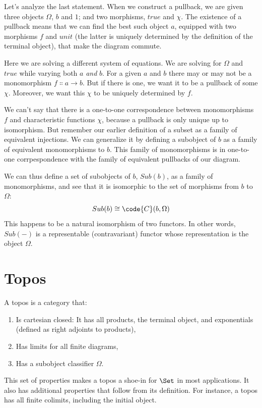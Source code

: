 Let's analyze the last statement. When we construct a pullback, we are
given three objects $\Omega$, $b$ and $1$; and two
morphisms, $true$ and $\chi$. The existence of a pullback
means that we can find the best such object $a$, equipped with
two morphisms $f$ and $unit$ (the latter is uniquely
determined by the definition of the terminal object), that make the
diagram commute.

Here we are solving a different system of equations. We are solving for
$\Omega$ and $true$ while varying both $a$ \emph{and}
$b$. For a given $a$ and $b$ there may or may not
be a monomorphism $f \Colon a \to b$. But if there is one, we
want it to be a pullback of some $\chi$. Moreover, we want this
$\chi$ to be uniquely determined by $f$.

We can't say that there is a one-to-one correspondence between
monomorphisms $f$ and characteristic functions $\chi$,
because a pullback is only unique up to isomorphism. But remember our
earlier definition of a subset as a family of equivalent injections. We
can generalize it by defining a subobject of $b$ as a family of
equivalent monomorphisms to $b$. This family of monomorphisms is
in one-to-one corrpespondence with the family of equivalent pullbacks of
our diagram.

We can thus define a set of subobjects of $b$, $Sub(b)$,
as a family of monomorphisms, and see that it is isomorphic to the set
of morphisms from $b$ to $\Omega$:
\[Sub(b) \cong \code{C}(b, \Omega)\]
This happens to be a natural isomorphism of two functors. In other
words, $Sub(-)$ is a representable (contravariant) functor whose
representation is the object $\Omega$.

\section{Topos}

A topos is a category that:

\begin{enumerate}
\tightlist
\item
  Is cartesian closed: It has all products, the terminal object, and
  exponentials (defined as right adjoints to products),
\item
  Has limits for all finite diagrams,
\item
  Has a subobject classifier $\Omega$.
\end{enumerate}

This set of properties makes a topos a shoe-in for $\Set$ in most
applications. It also has additional properties that follow from its
definition. For instance, a topos has all finite colimits, including the
initial object.

